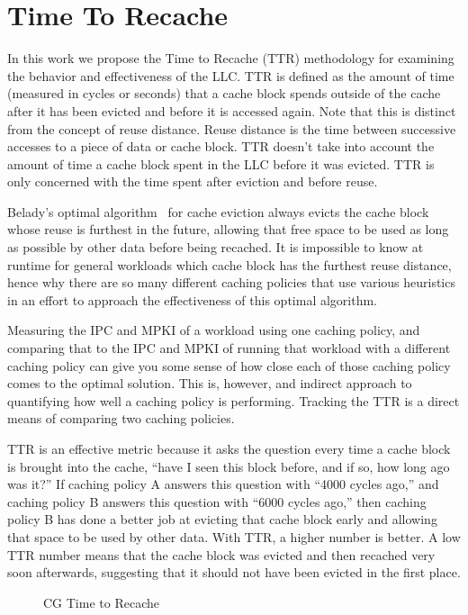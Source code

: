\section{Time To Recache}

In this work we propose the Time to Recache (TTR) methodology for
examining the behavior and effectiveness of the LLC.  TTR is defined
as the amount of time (measured in cycles or seconds) that a cache
block spends outside of the cache after it has been evicted and
before it is accessed again.  Note that this is distinct from the
concept of reuse distance.  Reuse distance is the time between
successive accesses to a piece of data or cache block.  TTR doesn't
take into account the amount of time a cache block spent in the LLC
before it was evicted.  TTR is only concerned with the time spent
after eviction and before reuse.

Belady's optimal algorithm~\cite{belady66} for cache eviction always evicts
the cache block whose reuse is furthest in the future, allowing that
free space to be used as long as possible by other data before being
recached.  It is impossible to know at runtime for general workloads
which cache block has the furthest reuse distance, hence why there are
so many different caching policies that use various heuristics in an
effort to approach the effectiveness of this optimal algorithm.

Measuring the IPC and MPKI of a workload using one caching policy, and
comparing that to the IPC and MPKI of running that workload with a
different caching policy can give you some sense of how close each of
those caching policy comes to the optimal solution.  This is,
however, and indirect approach to quantifying how well a caching
policy is performing.  Tracking the TTR is a direct means of
comparing two caching policies.

TTR is an effective metric because it asks the question every time a
cache block is brought into the cache, ``have I seen this block
before, and if so, how long ago was it?''  If caching policy A answers
this question with ``4000 cycles ago,'' and caching policy B answers
this question with ``6000 cycles ago,'' then caching policy B has done
a better job at evicting that cache block early and allowing that
space to be used by other data.  With TTR, a higher number is better.
A low TTR number means that the cache block was evicted and then
recached very soon afterwards, suggesting that it should not have
been evicted in the first place.

\begin{figure*}
\caption{CG Time to Recache}
\label{Fig:performance:cg}
\end{figure*}

